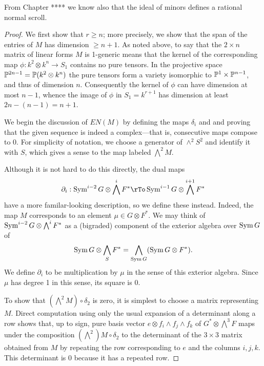 From Chapter **** we know also that the ideal of minors defines a rational normal scroll.

\begin{proof} We first show that $r\geq n$; more precisely, we show that the span of the entries of $M$ has dimension $\geq n+1$. As noted above, to say that the $2\times n$ matrix of linear forms $M$ is 1-generic means that
the kernel of the corresponding map $ \phi: k^2\otimes k^n \to S_1$ contains no pure tensors. In the projective
space ${\mathbb P}^{2n-1} = {\mathbb P}(k^2\otimes k^n)$ the pure tensors form a variety isomorphic to ${\mathbb P}^1\times {\mathbb P}^{n-1}$, and thus of dimension $n$. Consequently the kernel of $\phi$ can have dimension at most $n-1$, whence the image of $\phi$ 
in $S_1 = k^{r+1}$ has dimension at least $2n-(n-1) = n+1$. 

We begin the discussion of $EN(M)$ by defining the maps $\delta_i$ and and proving that the given sequence is indeed a complex---that is, consecutive maps compose to 0. For simplicity of notation, we choose a generator of $\wedge^2 S^2$
 and identify it with $S$, which gives a sense to the map labeled $\bigwedge^2M$.
 
  Although it is not hard to do this directly, the dual maps
 $$
 \partial_i: \Sym^{i-2} G \otimes \bigwedge^i F^* \rTo \Sym^{i-1} G \otimes \bigwedge^{i+1} F^*
 $$
 have a more familar-looking description, so we define these instead. Indeed, the map $M$ corresponds to an
 element $\mu\in G\otimes F^*$. We may think of $ \operatorname{Sym}^{i-2} G \otimes \bigwedge^i  F^*$
 as a (bigraded) component of the exterior algebra over $ \operatorname{Sym} G$ of 
 $$
  \operatorname{Sym} G \otimes \bigwedge_S  F^*= \bigwedge_{ \operatorname{Sym} G} (\operatorname{Sym} G \otimes  F^*).
 $$
We define $\partial_i$ to be  multiplication by $\mu$ in the sense of this exterior algebra. Since $\mu$ has degree 1
in this sense, its square is 0. 

To show that $(\bigwedge^2 M)\circ \delta_2$ is zero, it is simplest to choose a matrix representing $M$.
Direct computation using only the usual expansion of a determinant
along a row shows that, up to sign,
pure basis vector $e\otimes f_i\wedge f_j\wedge f_k$ of $G^*\otimes \bigwedge^3 F$
maps under the composition $(\bigwedge^2) M\circ \delta_2$ to the determinant
of the $3\times 3$ matrix obtained from $M$ by repeating the row corresponding to $e$ and
the columns $i,j,k$. This determinant is 0 because it has a repeated row.


\end{proof}
